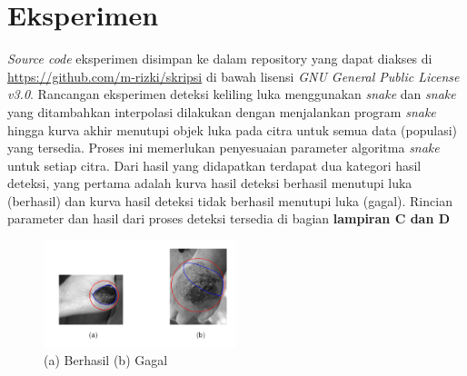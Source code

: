 \section{Eksperimen}
\emph{Source code} eksperimen disimpan ke dalam repository yang dapat diakses di \url{https://github.com/m-rizki/skripsi} di bawah lisensi \emph{GNU General Public License v3.0}. Rancangan eksperimen deteksi keliling luka menggunakan \emph{snake} dan \emph{snake} yang ditambahkan interpolasi dilakukan dengan menjalankan program \emph{snake} hingga kurva akhir menutupi objek luka pada citra untuk semua data (populasi) yang tersedia. Proses ini memerlukan penyesuaian parameter algoritma \emph{snake} untuk setiap citra. Dari hasil yang didapatkan terdapat dua kategori hasil deteksi, yang pertama adalah kurva hasil deteksi berhasil menutupi luka (berhasil) dan kurva hasil deteksi tidak berhasil menutupi luka (gagal). Rincian parameter dan hasil dari proses deteksi tersedia di bagian \textbf{lampiran C dan D}
\begin{figure}[H]
	\centering
	\includegraphics[width=0.5\textwidth]{gambar/result_good_bad}
	\caption{(a) Berhasil (b) Gagal}
	\label{Gambar:result_good_bad}
\end{figure}

